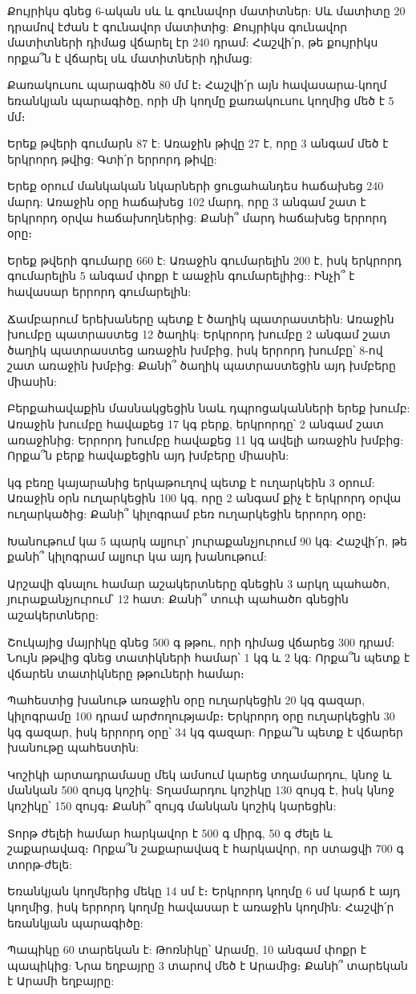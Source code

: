 \problem
Քույրիկս գնեց 6-ական սև և գունավոր մատիտներ: Սև մատիտը 20 
դրամով էժան է գունավոր մատիտից: Քույրիկս գունավոր մատիտների 
դիմաց վճարել էր 240 դրամ: Հաշվի՛ր, թե քույրիկս որքա՞ն է վճարել 
սև մատիտների դիմաց:

\problem
Քառակուսու պարագիծն 80 մմ է։ Հաշվի՛ր այն հավասարա-կողմ եռանկյան 
պարագիծը, որի մի կողմը քառակուսու կողմից մեծ է 5 մմ։

\problem
Երեք թվերի գումարն 87 է: Առաջին թիվը 27 է, որը 3 անգամ մեծ է 
երկրորդ թվից: Գտի՛ր երրորդ թիվը:

\problem
Երեք օրում մանկական նկարների ցուցահանդես հաճախեց 240 մարդ: Առաջին 
օրը հաճախեց 102 մարդ, որը 3 անգամ շատ է երկրորդ օրվա հաճախողներից: 
Քանի՞ մարդ հաճախեց երրորդ օրը։

\problem
Երեք թվերի գումարը 660 է: Առաջին գումարելին 200 է, իսկ երկրորդ 
գումարելին 5 անգամ փոքր է աաջին գումարելիից:: Ինչի՞ է հավասար 
երրորդ գումարելին:

\problem
Ճամբարում երեխաները պետք է ծաղիկ պատրաստեին: Առաջին խումբը 
պատրաստեց 12 ծաղիկ: Երկրորդ խումբը 2 անգամ շատ ծաղիկ պատրաստեց 
առաջին խմբից, իսկ երրորդ խումբը՝ 8-ով շատ առաջին խմբից: Քանի՞ 
ծաղիկ պատրաստեցին այդ խմբերը միասին:

\problem
Բերքահավաքին մասնակցեցին նաև դպրոցականների երեք խումբ: Առաջին 
խումբը հավաքեց 17 կգ բերք, երկրորդը՝ 2 անգամ շատ առաջինից: Երրորդ 
խումբը հավաքեց 11 կգ ավելի առաջին խմբից: Որքա՞ն բերք հավաքեցին 
այդ խմբերը միասին:

 կգ բեռը կայարանից երկաթուղով պետք է ուղարկեին 3 օրում: Առաջին 
օրն ուղարկեցին 100 կգ, որը 2 անգամ քիչ է երկրորդ օրվա ուղարկածից: 
Քանի՞ կիլոգրամ բեռ ուղարկեցին երրորդ օրը։

\problem
Խանութում կա 5 պարկ ալյուր՝ յուրաքանչյուրում 90 կգ: Հաշվի՛ր, թե 
քանի՞ կիլոգրամ ալյուր կա այդ խանութում:

\problem
Արշավի գնալու համար աշակերտները գնեցին 3 արկղ պահածո, յուրաքանչյուրում՝ 
12 հատ: Քանի՞ տուփ պահածո գնեցին աշակերտները:

\problem
Շուկայից մայրիկը գնեց 500 գ թթու, որի դիմաց վճարեց 300 դրամ: Նույն 
թթվից գնեց տատիկների համար՝ 1 կգ և 2 կգ: Որքա՞ն պետք է վճարեն 
տատիկները թթուների համար։

\problem
Պահեստից խանութ առաջին օրը ուղարկեցին 20 կգ գազար, կիլոգրամը 100 
դրամ արժողությամբ։ Երկրորդ օրը ուղարկեցին 30 կգ գազար, իսկ երրորդ 
օրը՝ 34 կգ գազար: Որքա՞ն պետք է վճարեր խանութը պահեստին:

\problem
Կոշիկի արտադրամասը մեկ ամսում կարեց տղամարդու, կնոջ և մանկան 500 
զույգ կոշիկ: Տղամարդու կոշիկը 130 զույգ է, իսկ կնոջ կոշիկը՝ 150 
զույգ։ Քանի՞ զույգ մանկան կոշիկ կարեցին:

\problem
Տորթ ժելեի համար հարկավոր է 500 գ միրգ, 50 գ ժելե և շաքարավազ։ 
Որքա՞ն շաքարավազ է հարկավոր, որ ստացվի 700 գ տորթ-ժելե:

\problem
Եռանկյան կողմերից մեկը 14 սմ է։ Երկրորդ կողմը 6 սմ կարճ է այդ 
կողմից, իսկ երրորդ կողմը հավասար է առաջին կողմին: Հաշվի՛ր եռանկյան 
պարագիծը:

\problem
Պապիկը 60 տարեկան է: Թոռնիկը՝ Արամը, 10 անգամ փոքր է պապիկից: 
Նրա եղբայրը 3 տարով մեծ է Արամից։ Քանի՞ տարեկան է Արամի եղբայրը:


\bye
